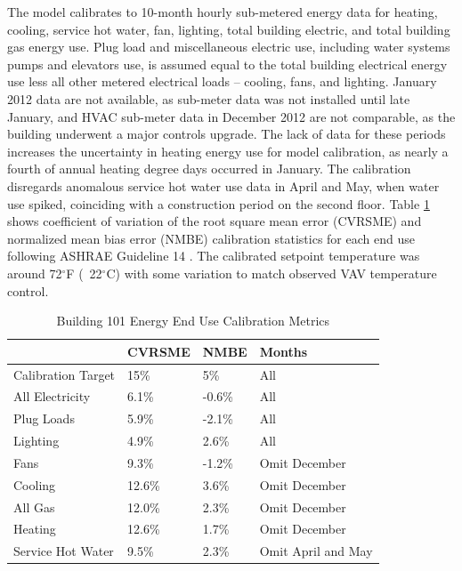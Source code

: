 \documentclass[review]{elsarticle}
\begin{document}
The model calibrates to 10-month hourly sub-metered energy data for heating, cooling, service hot water, fan, lighting, total building electric, and total building gas energy use. Plug load and miscellaneous electric use, including water systems pumps and elevators use, is assumed equal to the total building electrical energy use less all other metered electrical loads – cooling, fans, and lighting. January 2012 data are not available, as sub-meter data was not installed until late January, and HVAC sub-meter data in December 2012 are not comparable, as the building underwent a major controls upgrade. The lack of data for these periods increases the uncertainty in heating energy use for model calibration, as nearly a fourth of annual heating degree days occurred in January. The calibration disregards anomalous service hot water use data in April and May, when water use spiked, coinciding with a construction period on the second floor. Table \ref{calibration} shows coefficient of variation of the root square mean error (CVRSME) and normalized mean bias error (NMBE) calibration statistics for each end use following ASHRAE Guideline 14 \cite{ASHRAE14}. The calibrated setpoint temperature was around 72$^{\circ}$F (~22$^{\circ}$C)  with some variation to match observed VAV temperature control.

\begin{table}[h]
	\centering
	\begin{tabular}{l l l l}
		\hline
		& \textbf{CVRSME} & \textbf{NMBE} & \textbf{Months}\\
		\hline
		Calibration Target & 15\% & 5\% & All \\
		All Electricity & 6.1\% & -0.6\% & All \\
		Plug Loads & 5.9\% & -2.1\% & All \\
		Lighting & 4.9\% & 2.6\% & All \\
		Fans & 9.3\% & -1.2\% & Omit December \\
		Cooling & 12.6\% & 3.6\% & Omit December \\
		All Gas & 12.0\% & 2.3\% & Omit December \\
		Heating & 12.6\% & 1.7\% & Omit December \\
		Service Hot Water & 9.5\% & 2.3\% & Omit April and May \\
		\hline
	\end{tabular}
	\caption{Building 101 Energy End Use Calibration Metrics}
	\label{calibration}
\end{table}
\end{document}
